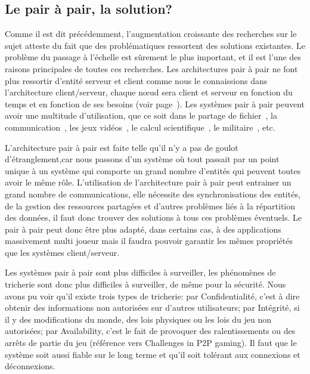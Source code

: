 	\subsection{Le pair à pair, la solution?}
	\par	%
	Comme il est dit précédemment, l'augmentation croissante des recherches sur le sujet atteste du fait que des problématiques ressortent des solutions existantes. Le problème du passage à l'échelle est sûrement le plus important, et il est l'une des raisons principales de toutes ces recherches. Les architectures pair à pair ne font plus ressortir d'entité serveur et client comme nous le connaissions dans l'architecture client/serveur, chaque nœud sera client et serveur en fonction du temps et en fonction de ses besoins (voir page~\pageref{P2P/ClServ}). Les systèmes pair à pair peuvent avoir une multitude d'utilisation, que ce soit dans le partage de fichier~\cite{gnutella,napster,kazaa}, la communication~\cite{skype}, les jeux vidéos~\cite{starwars}, le calcul scientifique~\cite{Pastry,xtremweb,chord}, le militaire~\cite{jxta}, etc. \\
	\par L'architecture pair à pair est faite telle qu'il n'y a pas de goulot d'étranglement,car nous passons d'un système où tout passait par un point unique à un système qui comporte un grand nombre d'entités qui peuvent toutes avoir le même rôle. L'utilisation de l'architecture pair à pair peut entrainer un grand nombre de communications, elle nécessite des synchronisations des entités, de la gestion des ressources partagées et d'autres problèmes liés à la répartition des données, il faut donc trouver des solutions à tous ces problèmes éventuels. Le pair à pair peut donc être plus adapté, dans certains cas, à des applications massivement multi joueur mais il faudra pouvoir garantir les mêmes propriétés que les systèmes client/serveur. \\
	\par Les systèmes pair à pair sont plus difficiles à surveiller, les phénomènes de tricherie sont donc plus difficiles à surveiller, de même pour la sécurité. Nous avons pu voir qu'il existe trois types de tricherie: par Confidentialité, c'est à dire obtenir des informations non autorisées sur d'autres utilisateurs; par Intégrité, si il y des modifications du monde, des lois physiques ou les lois du jeu non autorisées; par Availability, c'est le fait de provoquer des ralentissements ou des arrêts de partie du jeu (référence vers Challenges in P2P gaming). Il faut que le système soit aussi fiable sur le long terme et qu'il soit tolérant aux connexions et déconnexions.\\
